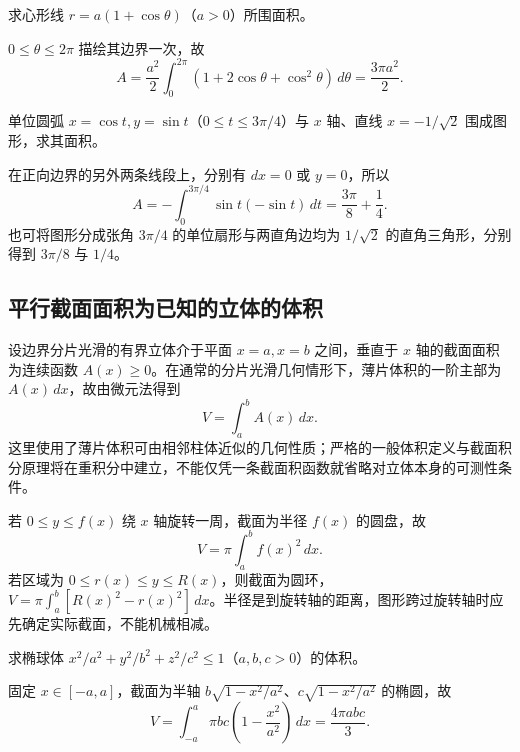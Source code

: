 \documentclass[UTF8,12pt,a4paper,fontset=fandol]{ctexbook}
\begin{document}
\begin{example}
\label{ex:cardioid-polar-area}
求心形线 $r=a(1+\cos\theta)$（$a>0$）所围面积。
\end{example}
\begin{solve}
$0\leq\theta\leq2\pi$ 描绘其边界一次，故
\[
    A=\frac{a^2}{2}\int_0^{2\pi}(1+2\cos\theta+\cos^2\theta)\,d\theta
    =\frac{3\pi a^2}{2}.
\]
\end{solve}

\begin{example}
\label{ex:circular-arc-area-two-methods}
单位圆弧 $x=\cos t,y=\sin t$（$0\leq t\leq3\pi/4$）与 $x$ 轴、直线 $x=-1/\sqrt2$ 围成图形，求其面积。
\end{example}
\begin{solve}
在正向边界的另外两条线段上，分别有 $dx=0$ 或 $y=0$，所以
\[
    A=-\int_0^{3\pi/4}\sin t(-\sin t)\,dt
    =\frac{3\pi}{8}+\frac14.
\]
也可将图形分成张角 $3\pi/4$ 的单位扇形与两直角边均为 $1/\sqrt2$ 的直角三角形，分别得到 $3\pi/8$ 与 $1/4$。
\end{solve}

\subsection{平行截面面积为已知的立体的体积}
\label{subsec:volumes-from-parallel-cross-sections}

设边界分片光滑的有界立体介于平面 $x=a,x=b$ 之间，垂直于 $x$ 轴的截面面积为连续函数 $A(x)\geq0$。在通常的分片光滑几何情形下，薄片体积的一阶主部为 $A(x)\,dx$，故由微元法得到
\begin{equation}
    V=\int_a^b A(x)\,dx.
    \label{eq:volume-by-cross-sections}
\end{equation}
这里使用了薄片体积可由相邻柱体近似的几何性质；严格的一般体积定义与截面积分原理将在重积分中建立，不能仅凭一条截面积函数就省略对立体本身的可测性条件。

若 $0\leq y\leq f(x)$ 绕 $x$ 轴旋转一周，截面为半径 $f(x)$ 的圆盘，故
\[
    V=\pi\int_a^b f(x)^2\,dx.
\]
若区域为 $0\leq r(x)\leq y\leq R(x)$，则截面为圆环，$V=\pi\int_a^b[R(x)^2-r(x)^2]\,dx$。半径是到旋转轴的距离，图形跨过旋转轴时应先确定实际截面，不能机械相减。

\begin{example}
\label{ex:ellipsoid-volume-cross-sections}
求椭球体 $x^2/a^2+y^2/b^2+z^2/c^2\leq1$（$a,b,c>0$）的体积。
\end{example}
\begin{solve}
固定 $x\in[-a,a]$，截面为半轴 $b\sqrt{1-x^2/a^2}$、$c\sqrt{1-x^2/a^2}$ 的椭圆，故
\[
    V=\int_{-a}^a\pi bc\left(1-\frac{x^2}{a^2}\right)\,dx
    =\frac{4\pi abc}{3}.
\]
\end{solve}
\end{document}
